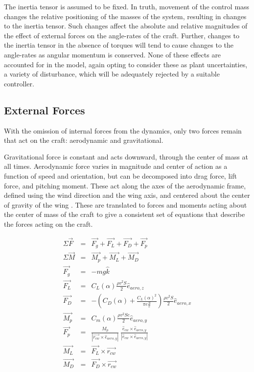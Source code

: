 \documentclass{sydeStyle}
\begin{document}
The inertia tensor is assumed to be fixed. In truth, movement of the control
mass changes the relative positioning of the masses of the system, resulting in
changes to the inertia tensor. Such changes affect the absolute and relative
magnitudes of the effect of external forces on the angle-rates of the craft.
Further, changes to the inertia tensor in the absence of torques will tend to
cause changes to the angle-rates as angular momentum is conserved. None of these
effects are accounted for in the model, again opting to consider these as plant
uncertainties, a variety of disturbance, which will be adequately rejected by a suitable
controller.

\subsection{External Forces}

With the omission of internal forces from the dynamics, only two forces remain
that act on the craft: aerodynamic and gravitational.

Gravitational force is constant and acts downward, through the center of mass at
all times. Aerodynamic force varies in magnitude and center of action as a
function of speed and orientation, but can be decomposed into drag force, lift
force, and pitching moment. These act along the axes of the aerodynamic frame,
defined using the wind direction and the wing axis, and centered about the
center of gravity of the wing \cite{etkin}. These are translated to forces
and moments acting about the center of mass of the craft to give a consistent
set of equations that describe the forces acting on the craft.

\begin{eqnarray*}
\Sigma \vec{F} &=& \vec{F_g} + \vec{F_L} + \vec{F_D} + \vec{F_p} \\
\Sigma \vec{M} &=& \vec{M_p} + \vec{M_L} + \vec{M_D} \\
\vec{F_g} &=& -mg\hat{k} \\
\vec{F_L} &=& C_L(\alpha) \frac{\rho v^2 S}{2}\hat{e}_{aero,z} \\
\vec{F_D} &=& -(C_D(\alpha) + \frac{C_L(\alpha)^2}{\pi e \frac{S}{c}})\frac{\rho v^2 S}{2}\hat{e}_{aero,x} \\
\vec{M_p} &=& C_m(\alpha) \frac{\rho v^2 S c}{2} \hat{e}_{aero,y} \\
\vec{F_p} &=& \frac{M_p}{| \vec{r_{cw}} \times \hat{e}_{aero,y} |} \
    \frac{\hat{e}_{cw} \times \hat{e}_{aero,y}}{|\hat{e}_{cw} \times \hat{e}_{aero,y}|} \\
\vec{M_L} &=& \vec{F_L} \times \vec{r_{cw}} \\
\vec{M_D} &=& \vec{F_D} \times \vec{r_{cw}} \\
\end{eqnarray*}
\end{document}
